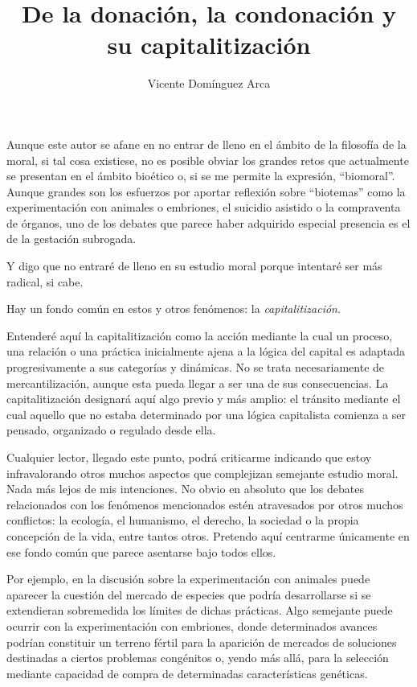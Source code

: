 \documentclass[12pt]{article}
\title{De la donación, la condonación y su capitalitización}
\author{Vicente Domínguez Arca}
\date{}
\begin{document}
\maketitle

Aunque este autor se afane en no entrar de lleno en el ámbito de la filosofía de la moral, si tal cosa existiese, no es posible obviar los grandes retos que actualmente se presentan en el ámbito bioético o, si se me permite la expresión, ``biomoral''. Aunque grandes son los esfuerzos por aportar reflexión sobre ``biotemas'' como la experimentación con animales o embriones, el suicidio asistido o la compraventa de órganos, uno de los debates que parece haber adquirido especial presencia es el de la gestación subrogada.

Y digo que no entraré de lleno en su estudio moral porque intentaré ser más radical, si cabe.

Hay un fondo común en estos y otros fenómenos: la \emph{capitalitización}.

Entenderé aquí la capitalitización como la acción mediante la cual un proceso, una relación o una práctica inicialmente ajena a la lógica del capital es adaptada progresivamente a sus categorías y dinámicas. No se trata necesariamente de mercantilización, aunque esta pueda llegar a ser una de sus consecuencias. La capitalitización designará aquí algo previo y más amplio: el tránsito mediante el cual aquello que no estaba determinado por una lógica capitalista comienza a ser pensado, organizado o regulado desde ella.

Cualquier lector, llegado este punto, podrá criticarme indicando que estoy infravalorando otros muchos aspectos que complejizan semejante estudio moral. Nada más lejos de mis intenciones. No obvio en absoluto que los debates relacionados con los fenómenos mencionados estén atravesados por otros muchos conflictos: la ecología, el humanismo, el derecho, la sociedad o la propia concepción de la vida, entre tantos otros. Pretendo aquí centrarme únicamente en ese fondo común que parece asentarse bajo todos ellos.

Por ejemplo, en la discusión sobre la experimentación con animales puede aparecer la cuestión del mercado de especies que podría desarrollarse si se extendieran sobremedida los límites de dichas prácticas. Algo semejante puede ocurrir con la experimentación con embriones, donde determinados avances podrían constituir un terreno fértil para la aparición de mercados de soluciones destinadas a ciertos problemas congénitos o, yendo más allá, para la selección mediante capacidad de compra de determinadas características genéticas.
\end{document}
